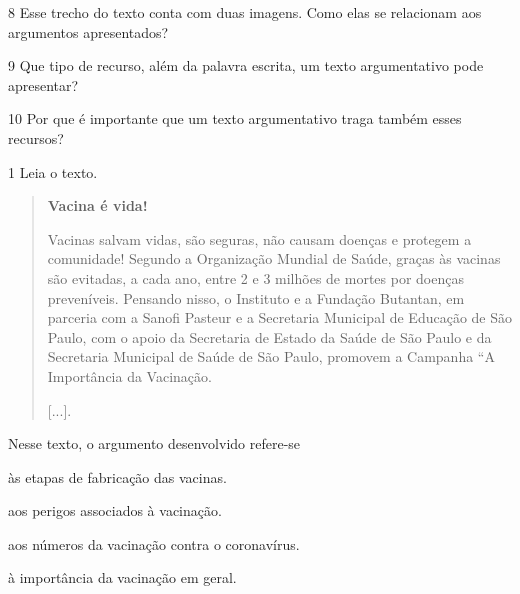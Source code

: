 \pagebreak
\num{8} Esse trecho do texto conta com duas imagens. Como elas se
relacionam aos argumentos apresentados?


\num{9} Que tipo de recurso, além da palavra escrita, um texto argumentativo
pode apresentar?


\num{10} Por que é importante que um texto argumentativo traga também esses recursos?


\pagebreak
{}

\num{1} Leia o texto.

\begin{quote}
\textbf{Vacina é vida!}

Vacinas salvam vidas, são seguras, não causam doenças e protegem a
comunidade! Segundo a Organização Mundial de Saúde, graças às vacinas
são evitadas, a cada ano, entre 2 e 3 milhões de mortes por doenças
preveníveis. Pensando nisso, o Instituto e a Fundação Butantan, em
parceria com a Sanofi Pasteur e a Secretaria Municipal de Educação de
São Paulo, com o apoio da Secretaria de Estado da Saúde de São Paulo e
da Secretaria Municipal de Saúde de São Paulo, promovem a Campanha “A
Importância da Vacinação.

{[}...{]}.

\end{quote}

Nesse texto, o argumento desenvolvido refere-se

\begin{escolha}
\item às etapas de fabricação das vacinas.

\item aos perigos associados à vacinação.

\item aos números da vacinação contra o coronavírus.

\item à importância da vacinação em geral.
\end{escolha}

